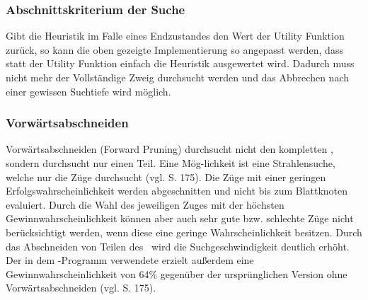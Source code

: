 \subsubsection{Abschnittskriterium der Suche}
Gibt die Heuristik im Falle eines Endzustandes den Wert der Utility Funktion zurück, so kann die oben gezeigte Implementierung so angepasst werden, dass statt der Utility Funktion einfach die Heuristik ausgewertet wird. Dadurch muss nicht mehr der Vollständige Zweig durchsucht werden und das Abbrechen nach einer gewissen Suchtiefe wird möglich.
 
\subsubsection{Vorwärtsabschneiden}
Vorwärtsabschneiden (Forward Pruning) durchsucht nicht den kompletten \gtree , sondern durchsucht nur einen Teil. Eine Mög-lichkeit ist eine Strahlensuche, welche nur die  Züge durchsucht (vgl. \cite{Russell.2016} S. 175). Die Züge mit einer geringen Erfolgswahrscheinlichkeit werden abgeschnitten und nicht bis zum Blattknoten evaluiert. Durch die Wahl des jeweiligen Zuges mit der höchsten Gewinnwahrscheinlichkeit können aber auch sehr gute bzw. schlechte Züge nicht berücksichtigt werden, wenn diese eine geringe Wahrscheinlichkeit besitzen. Durch das Abschneiden von Teilen des \gtree\ wird die Suchgeschwindigkeit deutlich erhöht. Der in dem \ot -Programm  verwendete  erzielt außerdem eine Gewinnwahrscheinlichkeit von 64\% gegenüber der ursprünglichen Version ohne Vorwärtsabschneiden (vgl. \cite{Russell.2016} S. 175).
